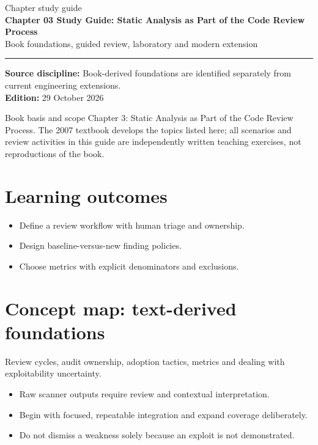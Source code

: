 \documentclass[10pt,letterpaper]{article}
\begin{document}
\hypersetup{pageanchor=false}%
\begin{titlepage}
\vspace*{1.0in}
{\color{bluegray}\Large Chapter study guide}\\[1.0em]
{\color{navy}\Huge\bfseries Chapter 03 Study Guide: Static Analysis as Part of the Code Review Process}\\[0.7em]
{\Large Book foundations, guided review, laboratory and modern extension}\\[2.0em]
\rule{\linewidth}{1.0pt}
\vfill
\textbf{Source discipline:} Book-derived foundations are identified separately from current engineering extensions.\\
\textbf{Edition:} 29 October 2026
\end{titlepage}\hypersetup{pageanchor=true}
\tableofcontents
\clearpage
\begin{focusbox}{Book basis and scope}
Chapter 3: Static Analysis as Part of the Code Review Process. The 2007 textbook develops the topics listed here; all scenarios and review activities in this guide are independently written teaching exercises, not reproductions of the book.\end{focusbox}
\section{Learning outcomes}
\begin{itemize}
\item Define a review workflow with human triage and ownership.
\item Design baseline-versus-new finding policies.
\item Choose metrics with explicit denominators and exclusions.
\end{itemize}

\section{Concept map: text-derived foundations}
Review cycles, audit ownership, adoption tactics, metrics and dealing with exploitability uncertainty.
\begin{itemize}
\item Raw scanner outputs require review and contextual interpretation.
\item Begin with focused, repeatable integration and expand coverage deliberately.
\item Do not dismiss a weakness solely because an exploit is not demonstrated.
\end{itemize}
\end{document}
